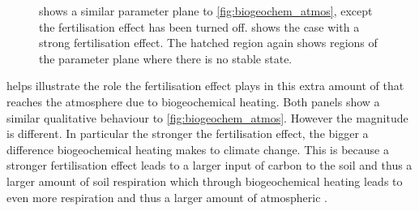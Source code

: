 \begin{figure}
  \centering
  \caption[The role of  fertilsation in the effect of biogeochemical heating on atmospheric ]{
     shows a similar parameter plane to \cref{fig:biogeochem_atmos}, except the  fertilisation effect has been turned off.  shows
    the case with a strong  fertilisation effect. The hatched region again shows regions of the parameter plane where there is no stable state.}
  \label{fig:biogeochem_co2_fert}
\end{figure}

 helps illustrate the role the  fertilisation effect plays in this extra amount of  that reaches the atmosphere due to biogeochemical heating.
Both panels show a similar qualitative behaviour to \cref{fig:biogeochem_atmos}. However the magnitude is different. In particular the stronger the  fertilisation effect, the bigger a
difference biogeochemical heating makes to climate change. This is because a stronger  fertilisation effect leads to a larger input of carbon to the soil and thus a larger amount
of soil respiration which through biogeochemical heating leads to even more respiration and thus a larger amount of atmospheric .

